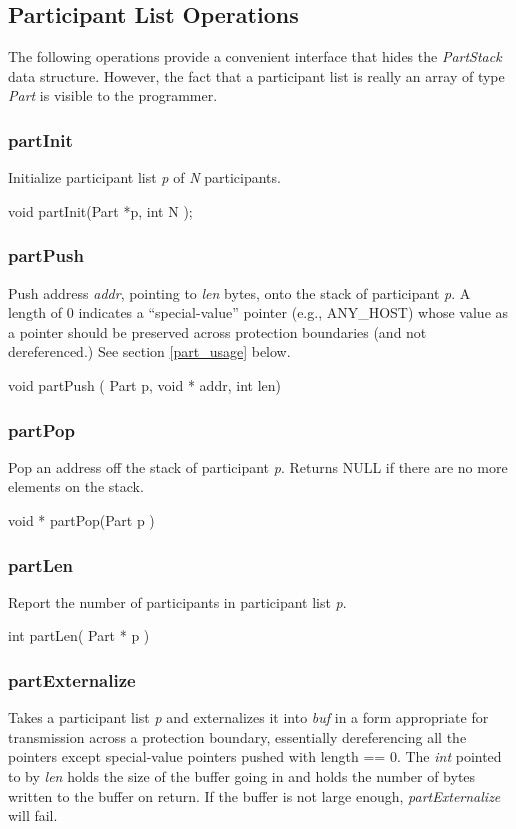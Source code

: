 \subsection{Participant List Operations}

The following operations provide a convenient interface that hides the
{\em PartStack} data structure. However, the fact that a participant
list is really an array of type {\em Part} is visible to the
programmer.

\subsubsection{partInit}
Initialize participant list {\em p} of {\em N} participants.\medskip

{\sem void} {\bold partInit}({\sem  Part *}{\caps p}, {\sem int} {\caps N} );
\medskip

\subsubsection{partPush}
Push address {\em addr}, pointing to {\em len} bytes, onto the 
stack of participant {\em p}.   A length of 0 indicates a ``special-value''
pointer (e.g., ANY\_HOST) whose value as a
pointer should be preserved across protection boundaries (and not
dereferenced.)  See section \ref{part_usage} below.

\medskip

{\sem void} {\bold partPush}
( {\sem Part } {\caps p}, {\sem void *} {\caps addr}, {\sem int} {\caps len})
\medskip

\subsubsection{partPop}
Pop an address off the stack of participant {\em p}.  Returns NULL if
there are no more elements on the stack.
\medskip

{\sem void *} {\bold partPop}({\sem Part }{\caps p} )
\medskip

\subsubsection{partLen}
Report the number of participants in participant list {\em p}.\medskip

{\sem int} {\bold partLen}( {\sem Part *} {\caps p} )
\medskip


\subsubsection{partExternalize}
Takes a participant list {\em p} and externalizes it
into {\em buf} in a form appropriate for transmission across a
protection boundary, essentially dereferencing all the pointers
except special-value pointers pushed with length == 0.  The {\em int}
 pointed to by {\em len} holds
the size of the buffer going in and holds the number of bytes written
to the buffer on return.  If the buffer is not large enough, 
{\em partExternalize} will fail.
\medskip

